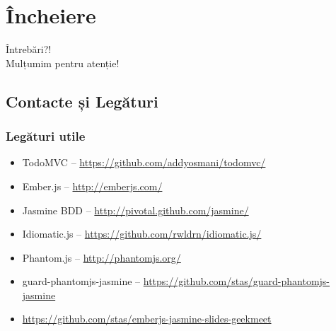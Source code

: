 \documentclass[compress]{beamer}
\begin{document}
\section{Încheiere}

\begin{frame}
  \begin{center}
  \huge Întrebări?!
  \\
  Mulțumim pentru atenție!
  \end{center}
\end{frame}

\subsection{Contacte și Legături}

\begin{frame}
\frametitle{Legături utile}

\begin{itemize}
  \item TodoMVC -- \url{https://github.com/addyosmani/todomvc/}
  \item Ember.js -- \url{http://emberjs.com/}
  \item Jasmine BDD -- \url{http://pivotal.github.com/jasmine/}
  \item Idiomatic.js -- \url{https://github.com/rwldrn/idiomatic.js/}
  \item Phantom.js -- \url{http://phantomjs.org/}
  \item guard-phantomjs-jasmine -- \url{https://github.com/stas/guard-phantomjs-jasmine}
  \item \url{https://github.com/stas/emberjs-jasmine-slides-geekmeet}
\end{itemize}

\end{frame}
\end{document}
